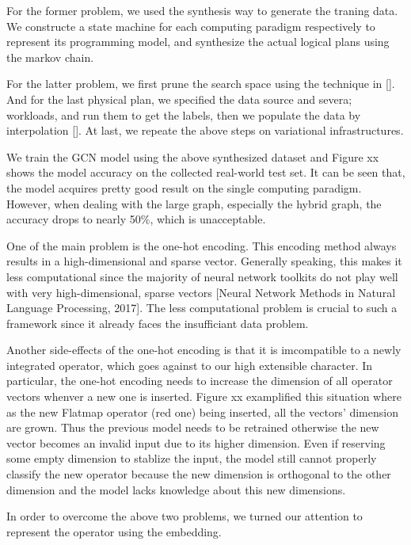 For the former problem, we used the synthesis way to generate the traning data. 
We constructe a state machine for each computing paradigm respectively to represent its programming model, and synthesize the actual logical plans using the markov chain. 

For the latter problem, we first prune the search space using the technique in []. 
And for the last physical plan, we specified the data source and severa; workloads, and run them to get the labels, then we populate the data by interpolation []. 
At last, we repeate the above steps on variational infrastructures.

We train the GCN model using the above synthesized dataset and Figure xx shows the model accuracy on the collected real-world test set. 
It can be seen that, the model acquires pretty good result on the single computing paradigm. 
However, when dealing with the large graph, especially the hybrid graph, the accuracy drops to nearly 50\%, which is unacceptable.

One of the main problem is the one-hot encoding. 
This encoding method always results in a high-dimensional and sparse vector. 
Generally speaking, this makes it less computational since the majority of neural network toolkits do not play well with very high-dimensional, sparse vectors [Neural Network Methods in Natural Language Processing, 2017]. 
The less computational problem is crucial to such a framework since it already faces the insufficiant data problem. 

Another side-effects of the one-hot encoding is that it is imcompatible to a newly integrated operator, which goes against to our high extensible character. 
In particular, the one-hot encoding needs to increase the dimension of all operator vectors whenver a new one is inserted. 
Figure xx examplified this situation where as the new Flatmap operator (red one) being inserted, all the vectors' dimension are grown. 
Thus the previous model needs to be retrained otherwise the new vector becomes an invalid input due to its higher dimension. 
Even if reserving some empty dimension to stablize the input, the model still cannot properly classify the new operator because the new dimension is orthogonal to the other dimension and the model lacks knowledge about this new dimensions.

In order to overcome the above two problems, we turned our attention to represent the operator using the embedding.

